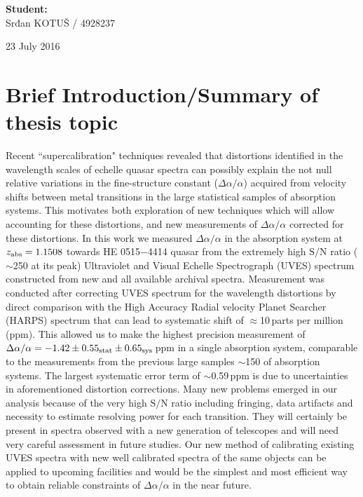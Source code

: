 \documentclass[useAMS,usenatbib,onecolumn]{mnras}
\newcommand{\SN}{\ensuremath{\textrm{S/N}}}
\newcommand{\zab}{\ensuremath{z_\text{\scriptsize abs}}}
\newcommand{\varal}{\ensuremath{\Delta \alpha/\alpha}}
\begin{document}
\begin{flushright}
{\bf Student:}\\
Srđan KOTUŠ / 4928237
\end{flushright}\hspace{8cm}


\begin{center}
23 July 2016
\end{center}
\newpage

\date{Date of the review}

\section{Brief Introduction/Summary of thesis topic}
\label{sec:intro}
Recent ``supercalibration" techniques revealed that distortions identified in the wavelength scales of echelle quasar spectra can possibly explain the not null relative variations in the fine-structure constant ($\varal$) acquired from velocity shifts between metal transitions in the large statistical samples of absorption systems. This motivates both exploration of new techniques which will allow accounting for these distortions, and new measurements of $\varal$ corrected for these distortions. In this work we measured $\varal$ in the absorption system at $\zab=1.1508$ towards HE 0515$-$4414 quasar from the extremely high $\SN$ ratio ($\sim$250 at its peak) Ultraviolet and Visual Echelle Spectrograph (UVES) spectrum constructed from new and all available archival spectra. Measurement was conducted after correcting UVES spectrum for the wavelength distortions by direct comparison with the High Accuracy Radial velocity Planet Searcher (HARPS) spectrum that can lead to systematic shift of $\approx$10\,parts per million (ppm). This allowed us to make the highest precision measurement of $\varal=-1.42\pm0.55_{\rm stat}\pm0.65_{\rm sys}$\,ppm in a single absorption system, comparable to the measurements from the previous large samples $\sim$150 of absorption systems. The largest systematic error term of $\sim$0.59\,ppm is due to uncertainties in aforementioned distortion corrections. Many new problems emerged in our analysis because of the very high $\SN$ ratio including fringing, data artifacts and necessity to estimate resolving power for each transition. They will certainly be present in spectra observed with a new generation of telescopes and will need very careful assessment in future studies. Our new method of calibrating existing UVES spectra with new well calibrated spectra of the same objects can be applied to upcoming facilities and would be the simplest and most efficient way to obtain reliable constraints of $\varal$ in the near future.
\end{document}
